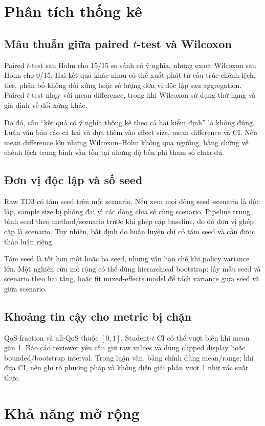 \section{Phân tích thống kê}
\subsection{Mâu thuẫn giữa paired $t$-test và Wilcoxon}
Paired $t$-test sau Holm cho 15/15 so sánh có ý nghĩa, nhưng exact Wilcoxon sau Holm cho 0/15. Hai kết quả khác nhau có thể xuất phát từ cấu trúc chênh lệch, ties, phân bố không đối xứng hoặc số lượng đơn vị độc lập sau aggregation. Paired $t$-test nhạy với mean difference, trong khi Wilcoxon sử dụng thứ hạng và giả định về đối xứng khác.

Do đó, câu ``kết quả có ý nghĩa thống kê theo cả hai kiểm định'' là không đúng. Luận văn báo cáo cả hai và dựa thêm vào effect size, mean difference và CI. Nếu mean difference lớn nhưng Wilcoxon--Holm không qua ngưỡng, bằng chứng về chênh lệch trung bình vẫn tồn tại nhưng độ bền phi tham số chưa đủ.

\subsection{Đơn vị độc lập và số seed}
Raw TD3 có tám seed trên mỗi scenario. Nếu xem mọi dòng seed--scenario là độc lập, sample size bị phóng đại vì các dòng chia sẻ cùng scenario. Pipeline trung bình seed theo method/scenario trước khi ghép cặp baseline, do đó đơn vị ghép cặp là scenario. Tuy nhiên, bất định do huấn luyện chỉ có tám seed và cần được thảo luận riêng.

Tám seed là tốt hơn một hoặc ba seed, nhưng vẫn hạn chế khi policy variance lớn. Một nghiên cứu mở rộng có thể dùng hierarchical bootstrap: lấy mẫu seed và scenario theo hai tầng, hoặc fit mixed-effects model để tách variance giữa seed và giữa scenario.

\subsection{Khoảng tin cậy cho metric bị chặn}
QoS fraction và all-QoS thuộc $[0,1]$. Student-$t$ CI có thể vượt biên khi mean gần 1. Báo cáo reviewer yêu cầu giữ raw values và dùng clipped display hoặc bounded/bootstrap interval. Trong luận văn, bảng chính dùng mean/range; khi đưa CI, nên ghi rõ phương pháp và không diễn giải phần vượt 1 như xác suất thực.

\section{Khả năng mở rộng}

